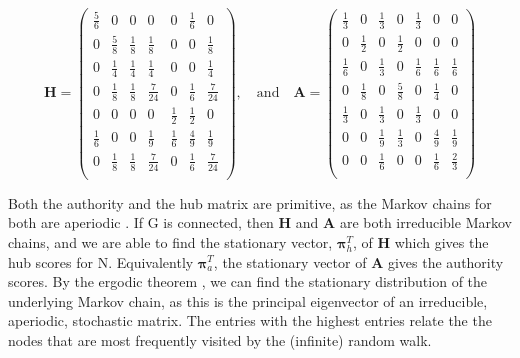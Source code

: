 \documentclass[11pt]{report}
\begin{document}
\begin{equation*} \renewcommand*{\arraystretch}{1.25}
\textbf{H}=\left(
\begin{array}{ccccccc}
\frac{5}{6} & 0 & 0 & 0 & 0 & \frac{1}{6} & 0 \\
0 & \frac{5}{8} & \frac{1}{8} & \frac{1}{8} & 0 & 0 & \frac{1}{8} \\
0 & \frac{1}{4} & \frac{1}{4} & \frac{1}{4} & 0 & 0 & \frac{1}{4} \\
0 & \frac{1}{8} & \frac{1}{8} & \frac{7}{24} & 0 & \frac{1}{6} & \frac{7}{24} \\
0 & 0 & 0 & 0 & \frac{1}{2} & \frac{1}{2} & 0\\
\frac{1}{6} & 0 & 0 & \frac{1}{9} & \frac{1}{6} & \frac{4}{9} & \frac{1}{9} \\
0 & \frac{1}{8} & \frac{1}{8} & \frac{7}{24} & 0 & \frac{1}{6} & \frac{7}{24} \\
\end{array}
\right)
\mathrm{,}\quad\mathrm{and}\quad
\textbf{A}=\left(
\begin{array}{ccccccc}
\frac{1}{3} & 0 & \frac{1}{3} & 0 & \frac{1}{3} & 0 & 0 \\
0 & \frac{1}{2} & 0 & \frac{1}{2} & 0 & 0 & 0 \\
\frac{1}{6} & 0 & \frac{1}{3} & 0 & \frac{1}{6} & \frac{1}{6} & \frac{1}{6} \\
0 & \frac{1}{8} & 0 & \frac{5}{8} & 0 & \frac{1}{4} & 0 \\
\frac{1}{3} & 0 & \frac{1}{3} & 0 & \frac{1}{3} & 0 & 0 \\
0 & 0 & \frac{1}{9} & \frac{1}{3} & 0 & \frac{4}{9} & \frac{1}{9} \\
0 & 0 & \frac{1}{6} & 0 & 0 & \frac{1}{6} & \frac{2}{3} \\
\end{array}
\right)
\end{equation*}

Both the authority and the hub matrix are primitive, as the Markov chains for both are aperiodic \cite{lempel2000stochastic}. If G is connected, then \textbf{H} and \textbf{A} are both irreducible Markov chains, and we are able to find the stationary vector, $\boldsymbol\pi_h^T$, of \textbf{H} which gives the hub scores for N. Equivalently $\boldsymbol\pi_a^T$, the stationary vector of \textbf{A} gives the authority scores. By the ergodic theorem \cite{gallager1992discrete}, we can find the stationary distribution of the underlying Markov chain, as this is the principal eigenvector of an irreducible, aperiodic, stochastic matrix. The entries with the highest entries relate the the nodes that are most frequently visited by the (infinite) random walk. 
\end{document}
